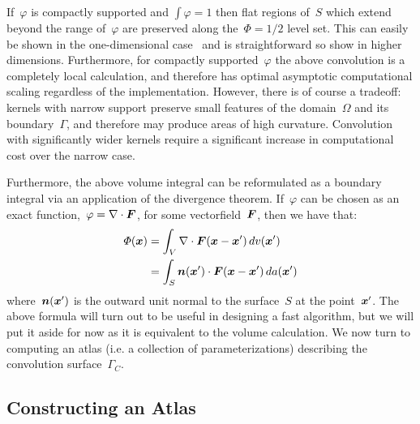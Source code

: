 \documentclass[11pt]{article}
\numberwithin{equation}{section}
\newcommand{\vct}{\vectorsym}
\newcommand\bx{\vct{x}}
\newcommand\bn{\boldsymbol n}
\renewcommand{\phi}{\varphi}
\begin{document}
If~$\phi$ is compactly supported and $\int \phi = 1$ then flat regions
of~$S$ which extend beyond the range of~$\phi$ are preserved
along the~$\Phi = 1/2$ level set. This can easily be shown in the
one-dimensional case~\cite{epstein_2016} and is straightforward so
show in higher dimensions. Furthermore, for compactly supported~$\phi$
the above convolution is a completely local calculation, and therefore
has optimal asymptotic computational scaling regardless of the
implementation. However, there is of course a tradeoff: kernels with
narrow support preserve small features of the domain~$\Omega$ and its
boundary~$\Gamma$, and therefore may produce areas of high
curvature. Convolution with significantly wider kernels require a
significant increase in computational cost over the narrow case.

Furthermore, the above volume integral can be reformulated as a
boundary integral via an application of the divergence
theorem. If~$\phi$ can be chosen as an exact
function,~$\phi = \nabla \cdot \vct{F}$, for some
vectorfield~$\vct{F}$, then we have that:
\begin{equation}
  \begin{aligned}
    \Phi(\bx) &= \int_{V} \nabla \cdot \vct{F}(\bx-\bx') \, dv(\bx') \\
    &= \int_{S} \bn(\bx') \cdot \vct{F}(\bx-\bx') \, da(\bx')
  \end{aligned}
\end{equation}
where~$\bn(\bx')$ is the outward unit normal to the surface~$S$ at the
point~$\bx'$. The above formula will turn out to be useful in
designing a fast algorithm, but we will put it aside for now as it is
equivalent to the volume calculation. We now turn to computing an
atlas (i.e. a collection of parameterizations) describing the
convolution surface~$\Gamma_C$.





\subsection{Constructing an Atlas}
\end{document}
